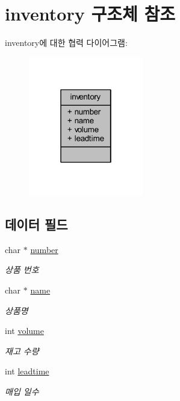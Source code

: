 \hypertarget{structinventory}{}\section{inventory 구조체 참조}
\label{structinventory}


inventory에 대한 협력 다이어그램\+:
\nopagebreak
\begin{figure}[H]
\begin{center}
\leavevmode
\includegraphics[width=142pt]{structinventory__coll__graph}
\end{center}
\end{figure}
\subsection*{데이터 필드}
\begin{DoxyCompactItemize}
\item 
char $\ast$ \hyperlink{structinventory_a77370bcefb3fe21e5f84e230581a50d7}{number}
\begin{DoxyCompactList}\small\item\em 상품 번호 \end{DoxyCompactList}\item 
char $\ast$ \hyperlink{structinventory_a5ac083a645d964373f022d03df4849c8}{name}
\begin{DoxyCompactList}\small\item\em 상품명 \end{DoxyCompactList}\item 
int \hyperlink{structinventory_aed48ca0bcd2162fd4fd495873e2631f5}{volume}
\begin{DoxyCompactList}\small\item\em 재고 수량 \end{DoxyCompactList}\item 
int \hyperlink{structinventory_ae0484109745ac918f2b3ed8551b41dcb}{leadtime}
\begin{DoxyCompactList}\small\item\em 매입 일수 \end{DoxyCompactList}\end{DoxyCompactItemize}


